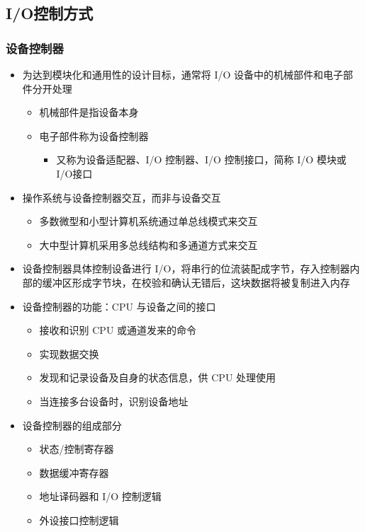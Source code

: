 \documentclass[cs4size,a4paper,10pt]{ctexart}
\begin{document}
	\subsection{I/O控制方式}
	\subsubsection{设备控制器}
	\begin{itemize}
		\item 为达到模块化和通用性的设计目标，通常将 I/O 设备中的机械部件和电子部件分开处理
		\begin{itemize}
			\item 机械部件是指设备本身
			\item 电子部件称为设备控制器
			\begin{itemize}
				\item 又称为设备适配器、I/O 控制器、I/O 控制接口，简称 I/O 模块或 I/O接口
			\end{itemize}
		\end{itemize}
		\item 操作系统与设备控制器交互，而非与设备交互
		\begin{itemize}
			\item 多数微型和小型计算机系统通过单总线模式来交互
			\item 大中型计算机采用多总线结构和多通道方式来交互
		\end{itemize}
		\item 设备控制器具体控制设备进行 I/O，将串行的位流装配成字节，存入控制器内部的缓冲区形成字节块，在校验和确认无错后，这块数据将被复制进入内存
		\item 设备控制器的功能：CPU 与设备之间的接口
		\begin{itemize}
			\item 接收和识别 CPU 或通道发来的命令
			\item 实现数据交换
			\item 发现和记录设备及自身的状态信息，供 CPU 处理使用
			\item 当连接多台设备时，识别设备地址
		\end{itemize}
		\item 设备控制器的组成部分
		\begin{itemize}
			\item 状态/控制寄存器
			\item 数据缓冲寄存器
			\item 地址译码器和 I/O 控制逻辑
			\item 外设接口控制逻辑
		\end{itemize}
	\end{itemize}
\end{document}
